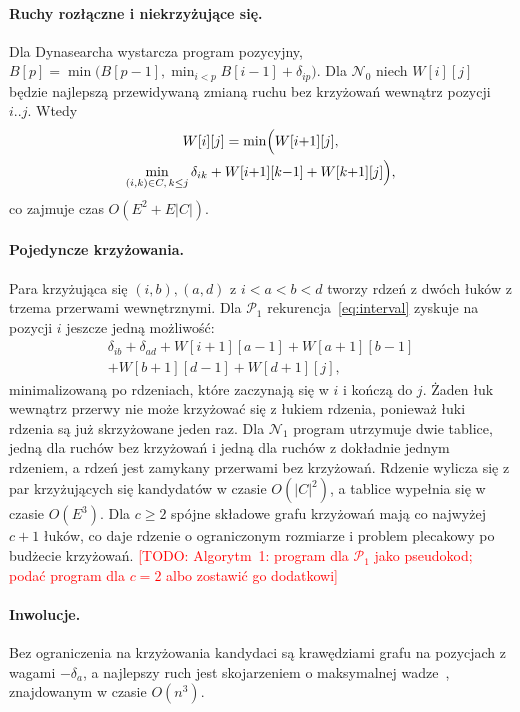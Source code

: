 \documentclass[10pt,twocolumn]{article}
\newcommand{\todo}[1]{\textcolor{red}{[TODO: #1]}}
\newcommand{\N}{\mathcal{N}}
\newcommand{\Pa}{\mathcal{P}}
\begin{document}
\paragraph{Ruchy rozłączne i niekrzyżujące się.} Dla Dynasearcha wystarcza
program pozycyjny,
$B[p]=\min\bigl(B[p-1],\min_{i<p}B[i-1]+\delta_{ip}\bigr)$. Dla $\N_0$
niech $W[i][j]$ będzie najlepszą przewidywaną zmianą ruchu bez krzyżowań
wewnątrz pozycji $i..j$. Wtedy
\begin{multline}\label{eq:interval}
W[i][j]=\min\Bigl(W[i{+}1][j],\\ \min_{(i,k)\in C,\,k\leq j}
\delta_{ik}+W[i{+}1][k{-}1]+W[k{+}1][j]\Bigr),
\end{multline}
co zajmuje czas $O(E^2+E|C|)$.

\paragraph{Pojedyncze krzyżowania.} Para krzyżująca się $(i,b),(a,d)$
z $i<a<b<d$ tworzy rdzeń z dwóch łuków z trzema przerwami wewnętrznymi.
Dla $\Pa_1$ rekurencja~\eqref{eq:interval} zyskuje na pozycji $i$ jeszcze
jedną możliwość:
\begin{multline}
\delta_{ib}+\delta_{ad}+W[i{+}1][a{-}1]+W[a{+}1][b{-}1]\\
+W[b{+}1][d{-}1]+W[d{+}1][j],
\end{multline}
minimalizowaną po rdzeniach, które zaczynają się w $i$ i kończą do $j$.
Żaden łuk wewnątrz przerwy nie może krzyżować się z łukiem rdzenia,
ponieważ łuki rdzenia są już skrzyżowane jeden raz. Dla $\N_1$ program
utrzymuje dwie tablice, jedną dla ruchów bez krzyżowań i jedną dla ruchów
z dokładnie jednym rdzeniem, a rdzeń jest zamykany przerwami bez
krzyżowań. Rdzenie wylicza się z par krzyżujących się kandydatów w czasie
$O(|C|^2)$, a tablice wypełnia się w czasie $O(E^3)$. Dla $c\geq2$ spójne
składowe grafu krzyżowań mają co najwyżej $c+1$ łuków, co daje rdzenie
o ograniczonym rozmiarze i problem plecakowy po budżecie krzyżowań.
\todo{Algorytm~1: program dla $\Pa_1$ jako pseudokod; podać program dla
$c=2$ albo zostawić go dodatkowi}

\paragraph{Inwolucje.} Bez ograniczenia na krzyżowania kandydaci są
krawędziami grafu na pozycjach z wagami $-\delta_a$, a najlepszy ruch jest
skojarzeniem o maksymalnej wadze~\cite{edmonds1965}, znajdowanym w czasie
$O(n^3)$.
\end{document}
